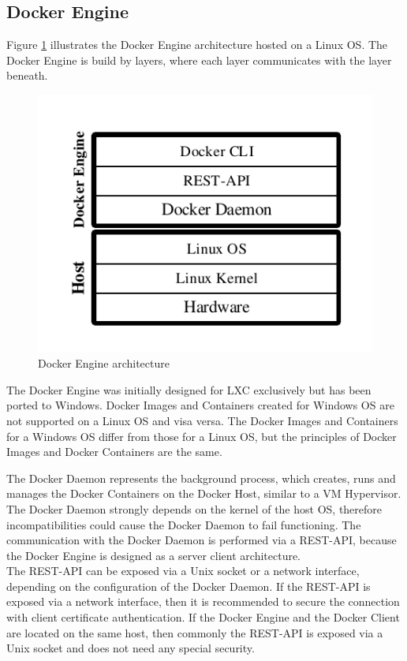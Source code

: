 \subsection{Docker Engine}
\label{sec:docker-engine}
Figure \ref{fig:docker-engine} illustrates the Docker Engine architecture hosted on a Linux OS. The Docker Engine is build by layers, where each layer communicates with the layer beneath.

\begin{figure}[htbp]
	\centering
	\includegraphics[scale=0.8]{images/docker-engine.pdf}
	\caption{Docker Engine architecture}
	\label{fig:docker-engine}
\end{figure} 

The Docker Engine was initially designed for LXC exclusively but has been ported to Windows. Docker Images and Containers created for Windows OS are not supported on a Linux OS and visa versa. The Docker Images and Containers for a Windows OS differ from those for a Linux OS, but the principles of Docker Images and Docker Containers are the same.

\label{sec:docker-daemon}
The Docker Daemon represents the background process, which creates, runs and manages the Docker Containers on the Docker Host, similar to a VM Hypervisor. The Docker Daemon strongly depends on the kernel of the host OS, therefore incompatibilities could cause the Docker Daemon to fail functioning. The communication with the Docker Daemon is performed via a REST-API, because the Docker Engine is designed as a server client architecture. \\

\label{sec:docker-rest-api}
The REST-API can be exposed via a Unix socket or a network interface, depending on the configuration of the Docker Daemon. If the REST-API is exposed via a network interface, then it is recommended to secure the connection with client certificate authentication. If the Docker Engine and the Docker Client are located on the same host, then commonly the REST-API is exposed via a Unix socket and does not need any special security. \\

